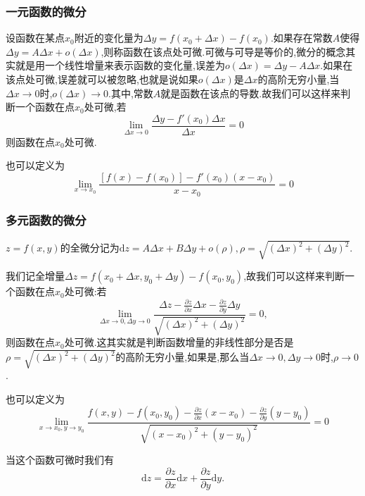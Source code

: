 \subsubsection{一元函数的微分}
设函数在某点$x_0$附近的变化量为$\varDelta y=f(x_0+\varDelta x)-f(x_0)$.如果存在常数$A$使得$\varDelta y=A\varDelta x+o(\varDelta x)$,则称函数在该点处可微.可微与可导是等价的,微分的概念其实就是用一个线性增量来表示函数的变化量,误差为$o(\varDelta x)=\varDelta y-A\varDelta x$.如果在该点处可微,误差就可以被忽略,也就是说如果$o(\varDelta x)$是$\varDelta x$的高阶无穷小量,当$\varDelta x \to 0$时,$o(\varDelta x)\to 0$.其中,常数$A$就是函数在该点的导数.故我们可以这样来判断一个函数在点$x_0$处可微,若
\begin{equation*}
    \lim_{\varDelta x \to 0} \frac{\varDelta y-f'(x_0)\varDelta x}{\varDelta x}=0
\end{equation*}
则函数在点$x_0$处可微.

也可以定义为
\begin{equation*}
    \lim_{x \to x_0} \frac{\left[f(x)-f(x_0)\right] -f'(x_0)(x-x_0)}{x-x_0}=0
\end{equation*}

\subsubsection{多元函数的微分}
$z=f(x,y)$的全微分记为$\mathrm{d} z=A\varDelta x+B\varDelta y+o(\rho ),\rho=\sqrt{(\varDelta x)^2+(\varDelta y)^2}$.

我们记全增量$\varDelta z=f(x_0+\varDelta x,y_0+\varDelta y)-f(x_0,y_0)$,故我们可以这样来判断一个函数在点$x_0$处可微:若
\begin{equation*}
    \lim_{\varDelta x \to 0,\varDelta y \to 0} \frac{\varDelta z-\frac{\partial z}{\partial x}\varDelta x-\frac{\partial z}{\partial y}\varDelta y}{\sqrt{(\varDelta x)^2+(\varDelta y)^2}}=0,
\end{equation*}
则函数在点$x_0$处可微.这其实就是判断函数增量的非线性部分是否是$\rho=\sqrt{(\varDelta x)^2+(\varDelta y)^2}$的高阶无穷小量,如果是,那么当$\varDelta x \to 0,\varDelta y \to 0$时,$\rho \to 0$.

也可以定义为
\begin{equation*}
    \lim_{x \to x_0,y \to y_0} \frac{f(x,y)-f(x_0,y_0)-\frac{\partial z}{\partial x}(x-x_0)-\frac{\partial z}{\partial y}(y-y_0)}{\sqrt{(x-x_0)^2+(y-y_0)^2}}=0
\end{equation*}

当这个函数可微时我们有
\begin{equation*}
    \mathrm{d} z=\frac{\partial z}{\partial x} \mathrm{d} x+\frac{\partial z}{\partial y} \mathrm{d} y.
\end{equation*}

